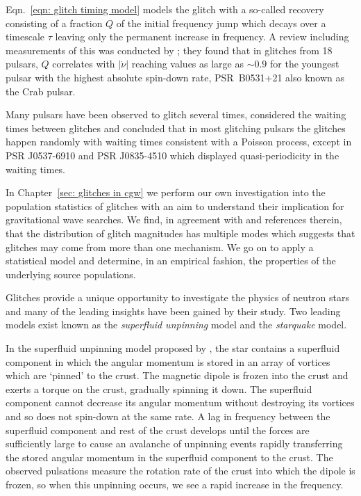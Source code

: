 Eqn.~\eqref{eqn: glitch timing model} models the glitch with a so-called recovery
consisting of a fraction $Q$ of the initial frequency jump which decays over
a timescale $\tau$ leaving only the permanent increase in frequency. A review
including measurements of this was conducted by \citet{Lyne2000}; they found
that in glitches from 18 pulsars, $Q$ correlates with $|\dot{\nu}|$ reaching
values as large as $\sim0.9$ for the youngest pulsar with the highest absolute
spin-down rate, PSR~B0531+21 also known as the Crab pulsar.

Many pulsars have been observed to glitch several times, \citet{Melatos2008}
considered the waiting times between glitches and concluded that in most
glitching pulsars the glitches happen randomly with waiting times consistent
with a Poisson process, except in PSR J0537-6910 and PSR J0835-4510 which
displayed quasi-periodicity in the waiting times.

In Chapter~\ref{sec: glitches in cgw} we perform our own investigation into the
population statistics of glitches with an aim to understand their implication
for gravitational wave searches. We find, in agreement with
\citet{Espinoza2011} and references therein, that the distribution of glitch
magnitudes has multiple modes which suggests that glitches may come from more
than one mechanism. We go on to apply a statistical model and determine, in an
empirical fashion, the properties of the underlying source populations.

Glitches provide a unique opportunity to investigate the physics of neutron
stars and many of the leading insights have been gained by their study. Two
leading models exist known as the \emph{superfluid unpinning} model and the
\emph{starquake} model.

In the superfluid unpinning model proposed by \citet{Anderson1975}, the star
contains a superfluid component in which the angular momentum is stored in an
array of vortices which are `pinned' to the crust. The magnetic dipole is
frozen into the crust and exerts a torque on the crust, gradually spinning it
down. The superfluid component cannot decrease its angular momentum without
destroying its vortices and so does not spin-down at the same rate.  A lag in
frequency between the superfluid component and rest of the crust develops until
the forces are sufficiently large to cause an avalanche of unpinning events
rapidly transferring the stored angular momentum in the superfluid component to
the crust. The observed pulsations measure the rotation rate of the crust into
which the dipole is frozen, so when this unpinning occurs, we see a rapid
increase in the frequency.

